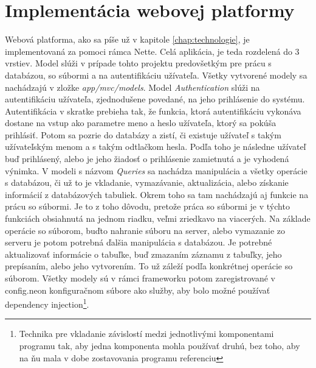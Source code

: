 \section{Implementácia webovej platformy}
Webová platforma, ako sa píše už v kapitole \ref{chap:technologie}, je implementovaná za pomoci rámca Nette. Celá aplikácia, je teda rozdelená do 3 vrstiev. Model slúži v prípade tohto projektu predovšetkým pre prácu s databázou, so súbormi a na autentifikáciu užívateľa. Všetky vytvorené modely sa nachádzajú v zložke \textit{app/mvc/models}. Model \textit{Authentication} slúži na autentifikáciu užívateľa, zjednodušene povedané, na jeho prihlásenie do systému. Autentifikácia v skratke prebieha tak, že funkcia, ktorá autentifikáciu vykonáva dostane na vstup ako parametre meno a heslo užívateľa, ktorý sa pokúša prihlásiť. Potom sa pozrie do databázy a zistí, či existuje užívateľ s takým užívateľským menom a s takým odtlačkom hesla. Podľa toho je následne užívateľ buď prihlásený, alebo je jeho žiadosť o prihlásenie zamietnutá a je vyhodená výnimka. V modeli s názvom \textit{Queries} sa nachádza manipulácia a všetky operácie s databázou, či už to je vkladanie, vymazávanie, aktualizácia, alebo získanie informácií z databázových tabuliek. Okrem toho sa tam nachádzajú aj funkcie na prácu so súbormi. Je to z toho dôvodu, pretože práca so súbormi je v týchto funkciách obsiahnutá na jednom riadku, veľmi zriedkavo na viacerých. Na základe operácie so súborom, buďto nahranie súboru na server, alebo vymazanie zo serveru je potom potrebná ďalšia manipulácia s databázou. Je potrebné aktualizovať informácie o tabuľke, buď zmazaním záznamu z tabuľky, jeho prepísaním, alebo jeho vytvorením. To už záleží podľa konkrétnej operácie so súborom. Všetky modely sú v rámci frameworku potom zaregistrované v config.neon konfiguračnom súbore ako služby, aby bolo možné používať dependency injection\footnote{Technika pre vkladanie závislostí medzi jednotlivými komponentami programu tak, aby jedna komponenta mohla používať druhú, bez toho, aby na ňu mala v dobe zostavovania programu referenciu}. 
